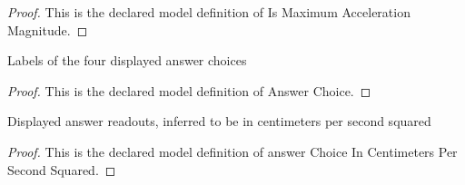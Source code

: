 \begin{proof}
  This is the declared model definition of Is Maximum Acceleration Magnitude.
\end{proof}
\begin{definition}
  \label{def:physics:phyx-mini-0230:phyxminiproblems-problemphyxmini0230-answerchoice}
  Labels of the four displayed answer choices
\end{definition}
\begin{proof}
  This is the declared model definition of Answer Choice.
\end{proof}
\begin{definition}
  \label{def:physics:phyx-mini-0230:phyxminiproblems-problemphyxmini0230-answerchoiceincentimeterspersecondsquared}
  Displayed answer readouts, inferred to be in centimeters per second squared
\end{definition}
\begin{proof}
  This is the declared model definition of answer Choice In Centimeters Per Second Squared.
\end{proof}
